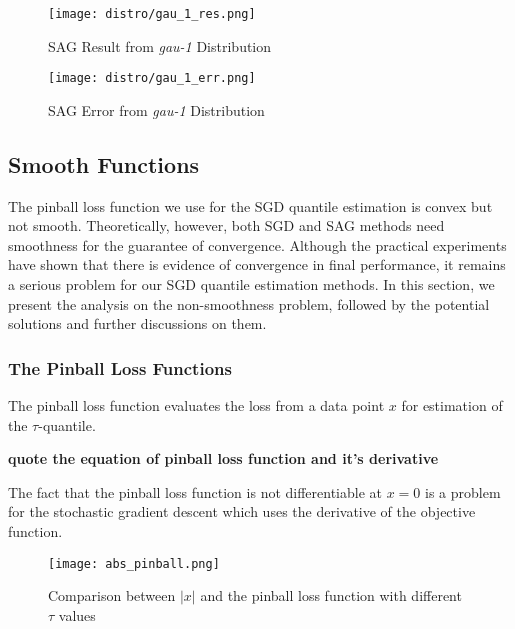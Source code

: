 \begin{figure}[H]
    \centering
	\texttt{[image: distro/gau\_1\_res.png]}
    \caption{SAG Result from \textit{gau-1} Distribution}
    \label{fig: sag_res}
\end{figure}

\begin{figure}[H]
    \centering
	\texttt{[image: distro/gau\_1\_err.png]}
    \caption{SAG Error from \textit{gau-1} Distribution}
    \label{fig: sag_err}

\end{figure}


\subsection{Smooth Functions}
\label{subsec: smooth_func}
The pinball loss function we use for the SGD quantile estimation is convex but not smooth. 
Theoretically, however, both SGD and SAG methods need smoothness for the guarantee of convergence. Although the practical experiments have shown that there is evidence of convergence in final performance, it remains a serious problem for our SGD quantile estimation methods. In this section, we present the analysis on the non-smoothness problem, followed by the potential solutions and further discussions on them.

\subsubsection{The Pinball Loss Functions}
\graphicspath{{Figures/Stepsize_adapt/Smooth_func/}{./}} 

The pinball loss function evaluates the loss from a data point $x$ for estimation of the $\tau$-quantile.

\textbf{quote the equation of pinball loss function and it's derivative}

The fact that the pinball loss function is not differentiable at $x= 0$ is a problem for the stochastic gradient descent which uses the derivative of the objective function.

\begin{figure*}[h!]
	\texttt{[image: abs\_pinball.png]}
	\caption{Comparison between $|x|$ and the pinball loss function with different $\tau$ values}
\end{figure*}

